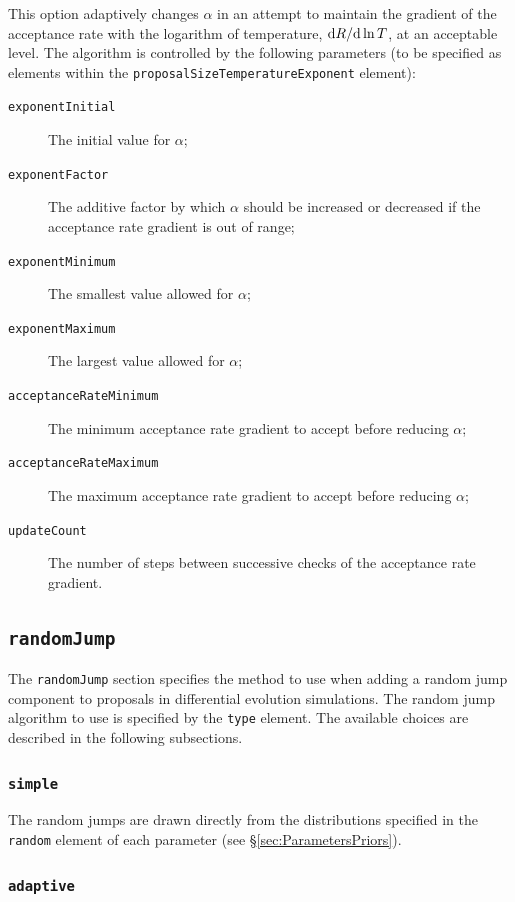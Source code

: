 This option adaptively changes $\alpha$ in an attempt to maintain the gradient of the acceptance rate with the logarithm of temperature, ${\rm d} R/{\rm d}\ln T$, at an acceptable level. The algorithm is controlled by the following parameters (to be specified as elements within the {\tt proposalSizeTemperatureExponent} element):
\begin{description}
\item[{\tt exponentInitial}] The initial value for $\alpha$;
\item[{\tt exponentFactor}] The additive factor by which $\alpha$ should be increased or decreased if the acceptance rate gradient is out of range;
\item[{\tt exponentMinimum}] The smallest value allowed for $\alpha$;
\item[{\tt exponentMaximum}] The largest value allowed for $\alpha$;
\item[{\tt acceptanceRateMinimum}] The minimum acceptance rate gradient to accept before reducing $\alpha$;
\item[{\tt acceptanceRateMaximum}] The maximum acceptance rate gradient to accept before reducing $\alpha$;
\item[{\tt updateCount}] The number of steps between successive checks of the acceptance rate gradient.
\end{description}


\subsection{{\tt randomJump}}

The {\tt randomJump} section specifies the method to use when adding a random jump component to proposals in differential evolution simulations. The random jump algorithm to use is specified by the {\tt type} element. The available choices are described in the following subsections.

\subsubsection{{\tt simple}}

The random jumps are drawn directly from the distributions specified in the {\tt random} element of each parameter (see \S\ref{sec:ParametersPriors}).

\subsubsection{{\tt adaptive}}

